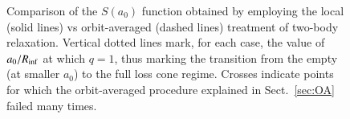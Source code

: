 \documentclass[desactivate]{aa}
\begin{document}
        
        

                \begin{figure}
        \centering
        \caption{Comparison of the $S(a_0)$ function obtained by employing the local (solid lines) vs orbit-averaged (dashed lines) treatment of two-body relaxation. Vertical dotted lines mark, for each case, the value of $a_0/R_{\rm inf}$ at which $q=1$, thus marking the transition from the empty (at smaller $a_0$) to the full loss cone regime. Crosses indicate points for which the orbit-averaged procedure explained in Sect.\ \ref{sec:OA} failed many times.}
        \label{fig:OA}
    \end{figure}

    
\end{document}
